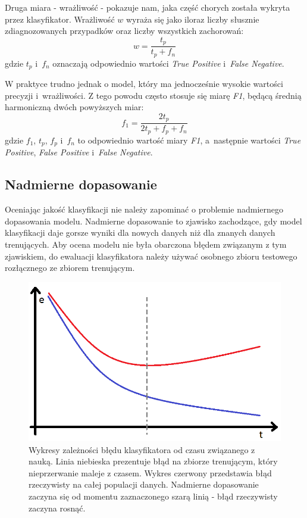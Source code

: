 \documentclass[../thesis.tex]{subfiles}
\begin{document}
Druga miara - wrażliwość - pokazuje nam, jaka część chorych została wykryta przez klasyfikator. Wrażliwość $w$ wyraża się jako iloraz liczby słusznie zdiagnozowanych przypadków oraz liczby wszystkich zachorowań:
\[w = \frac{t_p}{t_p + f_n}\]
gdzie $t_p$ i~$f_n$ oznaczają odpowiednio wartości \emph{True Positive} i~\emph{False Negative}.

W praktyce trudno jednak o model, który ma jednocześnie wysokie wartości precyzji i~wrażliwości. Z tego powodu często stosuje się miarę \emph{F1}, będącą średnią harmoniczną dwóch powyższych miar:
\[f_1 = \frac{2t_p}{2t_p + f_p + f_n}\]
gdzie $f_1$, $t_p$, $f_p$ i~$f_n$ to odpowiednio wartość miary \emph{F1}, a~następnie wartości \emph{True Positive}, \emph{False Positive} i~\emph{False Negative}.

\subsection{Nadmierne dopasowanie}

Oceniając jakość klasyfikacji nie należy zapominać o problemie nadmiernego dopasowania modelu. Nadmierne dopasowanie to zjawisko zachodzące, gdy model klasyfikacji daje gorsze wyniki dla nowych danych niż dla znanych danych trenujących. Aby ocena modelu nie była obarczona błędem związanym z tym zjawiskiem, do ewaluacji klasyfikatora należy używać osobnego zbioru testowego rozłącznego ze zbiorem trenującym.

\begin{figure}[h]
\centering
\includegraphics[height=.2\textheight]{overfitting.png}
\caption{Wykresy zależności błędu klasyfikatora od czasu związanego z nauką. Linia niebieska prezentuje błąd na zbiorze trenującym, który nieprzerwanie maleje z czasem. Wykres czerwony przedstawia błąd rzeczywisty na całej populacji danych. Nadmierne dopasowanie zaczyna się od momentu zaznaczonego szarą linią - błąd rzeczywisty zaczyna rosnąć.}
\label{classification:overfitting}
\end{figure}
\end{document}
